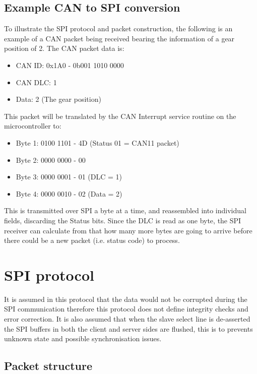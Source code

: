 \documentclass[11pt]{report} %
\begin{document}
	\subsection{Example CAN to SPI conversion}
	To illustrate the SPI protocol and packet construction, the following
	is an example of a CAN packet being received bearing the information
	of a gear position of 2.
	The CAN packet data is:
	
	\begin{itemize}
		\item CAN ID: 0x1A0 - 0b001 1010 0000 
		\item CAN DLC: 1 
		\item Data: 2 (The gear position)
	\end{itemize}
	
	This packet will be translated by the CAN Interrupt service routine on
	the microcontroller to:
			
	\begin{itemize}
		\item Byte 1: 0100 1101 - 4D (Status 01 = CAN11 packet)
		\item Byte 2: 0000 0000 - 00
		\item Byte 3: 0000 0001 - 01 (DLC = 1)
		\item Byte 4: 0000 0010 - 02 (Data = 2)
	\end{itemize}
	
	This is transmitted over SPI a byte at a time, and reassembled into individual
	fields, discarding the Status bits.
	Since the DLC is read as one byte, the SPI receiver can calculate from that
	how many more bytes are going to arrive before there could be a 
	new packet (i.e. status code) to process.

	\section{SPI protocol}
	\label{sec:spi_proto}
	It is assumed in this protocol that the data would not be corrupted
	during the SPI communication therefore this protocol does not define
	integrity checks and error correction. It is also assumed that when the
	slave select line is de-asserted the SPI buffers in both the client and
	server sides are flushed, this is to prevents unknown state and possible
	synchronisation issues.	 

		\subsection{Packet structure}
\end{document}
